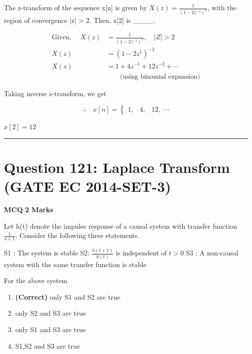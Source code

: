 \documentclass[11pt,a4paper]{article}
\begin{document}
\noindent The z-transform of the sequence x[n] is given by $X(z)=\frac{1}{(1-2z^{-1})^{2}}$, with the region of convergence |z| > 2. Then, x[2] is \_\_\_\_.


\begin{tcolorbox}[solbox, title=Detailed Solution -- Question 120]
\[
\begin{aligned} \text{Given, }\quad X(z)&=\frac{1}{\left(1-2 z^{-1}\right)^{2}}, \quad|Z| > 2 \\ X(z)&=\left(1-2 z^{1}\right)^{-2} \\ X(z)&=1+4 z^{-1}+12 z^{-2}+\cdots\\ &\quad \quad \text{(using binomial expansion)} \end{aligned}
\]

 Taking inverse z-transform, we get 

\[
\therefore \quad x[n]=\left\{\begin{array}{lll}1, & 4, & 12,\end{array} \cdots\right.
\]

$x[2]=12$
\end{tcolorbox}

\vspace{1.5em}
\hrule
\vspace{1.5em}

\section*{Question 121: Laplace Transform (GATE EC 2014-SET-3)}
\noindent \textbf{\color{primary}MCQ} \hfill \textbf{\color{secondary}2 Marks}


\noindent Let h(t) denote the impulse response of a causal system with transfer function $\frac{1}{s+1}$. Consider the following three statements. 

S1 : The system is stable 
                                                                                                         S2: $\frac{h(t+1)}{h(t)}$ is independent of $t > 0$                                                  
S3 : A non-causal system with the same transfer function is stable 
 
                         For the above system


\begin{enumerate}[label=(\Alph*)]
    \item \textbf{(Correct)} only S1 and S2 are true
    \item only S2 and S3 are true
    \item only S1 and S3 are true
    \item S1,S2 and S3 are true
\end{enumerate}
\end{document}
